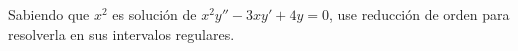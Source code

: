 Sabiendo que $x^2$ es solución de $x^2y''-3xy'+4y=0$, use reducción de orden para resolverla en sus intervalos regulares.
